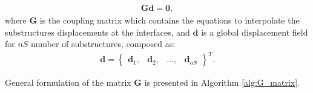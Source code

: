\begin{eqnarray}
	\textbf{G}\textbf{d}=\textbf{0},
	\label{eq:cond_disp}
\end{eqnarray}
%
where \textbf{G} is the coupling matrix which contains the equations to interpolate the substructures displacements at the interfaces, and \(\textbf{d}\) is a global displacement field for \(nS\) number of substructures, composed as:
\begin{eqnarray}
	\textbf{d} = \left\{\begin{array}{cccc}
		\textbf{d}_1, & \textbf{d}_2, &\ldots, & \textbf{d}_{nS}
	\end{array}\right\}^T.
	\label{eq:displacements}
\end{eqnarray}

General formulation of the matrix \textbf{G} is presented in Algorithm \ref{alg:G_matrix}.

